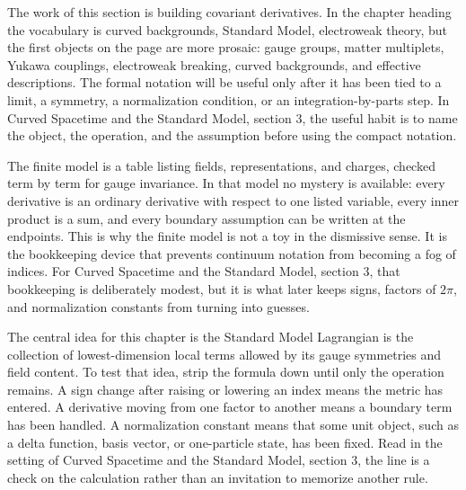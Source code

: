 











The work of this section is building covariant derivatives.  In the chapter heading the vocabulary is curved backgrounds, Standard Model, electroweak theory, but the first objects on the page are more prosaic: gauge groups, matter multiplets, Yukawa couplings, electroweak breaking, curved backgrounds, and effective descriptions.  The formal notation will be useful only after it has been tied to a limit, a symmetry, a normalization condition, or an integration-by-parts step.  In Curved Spacetime and the Standard Model, section 3, the useful habit is to name the object, the operation, and the assumption before using the compact notation.

The finite model is a table listing fields, representations, and charges, checked term by term for gauge invariance.  In that model no mystery is available: every derivative is an ordinary derivative with respect to one listed variable, every inner product is a sum, and every boundary assumption can be written at the endpoints.  This is why the finite model is not a toy in the dismissive sense.  It is the bookkeeping device that prevents continuum notation from becoming a fog of indices.  For Curved Spacetime and the Standard Model, section 3, that bookkeeping is deliberately modest, but it is what later keeps signs, factors of \(2\pi\), and normalization constants from turning into guesses.

The central idea for this chapter is the Standard Model Lagrangian is the collection of lowest-dimension local terms allowed by its gauge symmetries and field content.  To test that idea, strip the formula down until only the operation remains.  A sign change after raising or lowering an index means the metric has entered.  A derivative moving from one factor to another means a boundary term has been handled.  A normalization constant means that some unit object, such as a delta function, basis vector, or one-particle state, has been fixed.  Read in the setting of Curved Spacetime and the Standard Model, section 3, the line is a check on the calculation rather than an invitation to memorize another rule.

